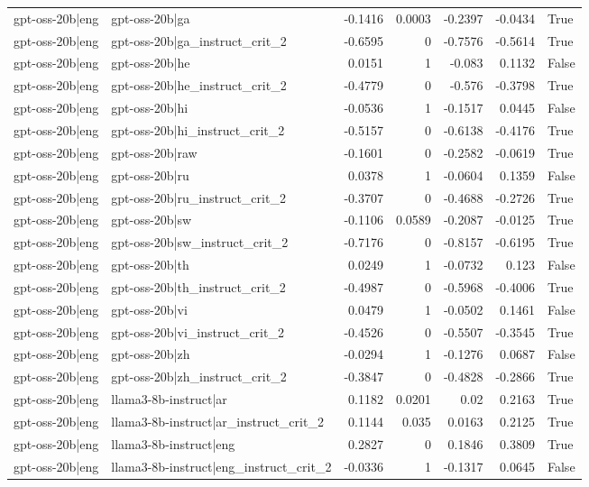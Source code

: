 \begin{table}
\begin{tabular}{l l r r r r l}
gpt-oss-20b|eng & gpt-oss-20b|ga & -0.1416 & 0.0003 & -0.2397 & -0.0434 & True \\
gpt-oss-20b|eng & gpt-oss-20b|ga_instruct_crit_2 & -0.6595 & 0 & -0.7576 & -0.5614 & True \\
gpt-oss-20b|eng & gpt-oss-20b|he & 0.0151 & 1 & -0.083 & 0.1132 & False \\
gpt-oss-20b|eng & gpt-oss-20b|he_instruct_crit_2 & -0.4779 & 0 & -0.576 & -0.3798 & True \\
gpt-oss-20b|eng & gpt-oss-20b|hi & -0.0536 & 1 & -0.1517 & 0.0445 & False \\
gpt-oss-20b|eng & gpt-oss-20b|hi_instruct_crit_2 & -0.5157 & 0 & -0.6138 & -0.4176 & True \\
gpt-oss-20b|eng & gpt-oss-20b|raw & -0.1601 & 0 & -0.2582 & -0.0619 & True \\
gpt-oss-20b|eng & gpt-oss-20b|ru & 0.0378 & 1 & -0.0604 & 0.1359 & False \\
gpt-oss-20b|eng & gpt-oss-20b|ru_instruct_crit_2 & -0.3707 & 0 & -0.4688 & -0.2726 & True \\
gpt-oss-20b|eng & gpt-oss-20b|sw & -0.1106 & 0.0589 & -0.2087 & -0.0125 & True \\
gpt-oss-20b|eng & gpt-oss-20b|sw_instruct_crit_2 & -0.7176 & 0 & -0.8157 & -0.6195 & True \\
gpt-oss-20b|eng & gpt-oss-20b|th & 0.0249 & 1 & -0.0732 & 0.123 & False \\
gpt-oss-20b|eng & gpt-oss-20b|th_instruct_crit_2 & -0.4987 & 0 & -0.5968 & -0.4006 & True \\
gpt-oss-20b|eng & gpt-oss-20b|vi & 0.0479 & 1 & -0.0502 & 0.1461 & False \\
gpt-oss-20b|eng & gpt-oss-20b|vi_instruct_crit_2 & -0.4526 & 0 & -0.5507 & -0.3545 & True \\
gpt-oss-20b|eng & gpt-oss-20b|zh & -0.0294 & 1 & -0.1276 & 0.0687 & False \\
gpt-oss-20b|eng & gpt-oss-20b|zh_instruct_crit_2 & -0.3847 & 0 & -0.4828 & -0.2866 & True \\
gpt-oss-20b|eng & llama3-8b-instruct|ar & 0.1182 & 0.0201 & 0.02 & 0.2163 & True \\
gpt-oss-20b|eng & llama3-8b-instruct|ar_instruct_crit_2 & 0.1144 & 0.035 & 0.0163 & 0.2125 & True \\
gpt-oss-20b|eng & llama3-8b-instruct|eng & 0.2827 & 0 & 0.1846 & 0.3809 & True \\
gpt-oss-20b|eng & llama3-8b-instruct|eng_instruct_crit_2 & -0.0336 & 1 & -0.1317 & 0.0645 & False \\

\end{tabular}
\end{table}
